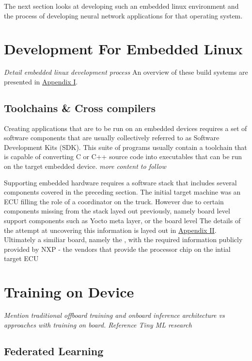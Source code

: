 The next section looks at developing such an embedded linux environment and the process of developing neural network applications for that operating system.

\section[Development Process for Embedded Linux]{Development For Embedded Linux}
\textit{Detail embedded linux development process}
An overview of these build systems are presented in \hyperref[buildsystems]{Appendix I}.

\subsection[SDKs \& Compiler Toolchains]{Toolchains \& Cross compilers}

Creating applications that are to be run on an embedded devices requires a set of software components that are usually collectively referred to as Software Development Kits (SDK). This suite of programs usually contain a toolchain that is capable of converting C or C++ source code into executables that can be run on the target embedded device. \textit{more content to follow}

Supporting embedded hardware requires a software stack that includes several components covered in the preceding section. The initial target machine was an ECU filling the role of a coordinator on the truck. However due to certain components missing from the stack layed out previously, namely board level support components such as Yocto meta layer, or the board level The details of the attempt at uncovering this information is layed out in \hyperref[rtc-c300]{Appendix II}. Ultimately a similiar board, namely the , with the required information publicly provided by NXP - the vendors that provide the processor chip on the intial target ECU

\section{Training on Device}

\textit{Mention traditional offboard training and onboard inference architecture vs approaches with training on board. Reference Tiny ML research}

\subsection{Federated Learning}

